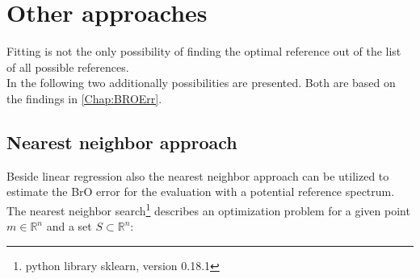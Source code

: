 \documentclass  [
  paper    = a4,
  BCOR     = 10mm,
  twoside,
  fontsize = 12pt,
  fleqn,
  toc      = bibnumbered,
  toc      = listofnumbered,
  numbers  = noendperiod,
  headings = normal,
  listof   = leveldown,
  version  = 3.03
]                                       {scrreprt}
\begin{document}
		
%	
%
%
%
	\section{Other approaches}

	Fitting is not the only possibility of finding the optimal reference out of the list of all possible references.\\
	In the following two additionally possibilities are presented. Both are based on the findings in \cref{Chap:BROErr}. 

\subsection{Nearest neighbor approach}


Beside linear regression also the nearest neighbor approach can be utilized to estimate the BrO error for the evaluation with a potential reference spectrum.
%
The nearest neighbor search\footnote{python library sklearn, version 0.18.1} describes an optimization problem for a given point $m \in \mathbb{R}^n$ and a set $S \subset \mathbb{R}^n$:
\end{document}
